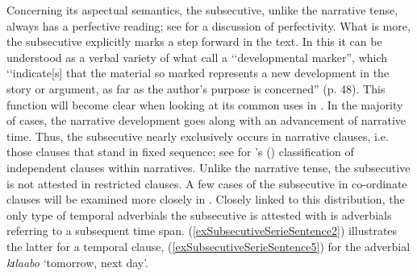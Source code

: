 Concerning its aspectual semantics, the subsecutive, unlike the narrative tense, always has a perfective reading; see  for a discussion of perfectivity. What is more, the subsecutive explicitly marks a step forward in the text. In this it can be understood as a verbal variety of what \citet{DooleyRALevinsohnSH2000} call a \lq\lq developmental marker'', which \lq\lq indicate[s] that the material so marked represents a new development in the story or argument, as far as the author's purpose is concerned'' (p. 48). This function will become clear when looking at its common uses in . In the majority of cases, the narrative development goes along with an advancement of narrative time. Thus, the subsecutive nearly exclusively occurs in narrative clauses, i.e. those clauses that stand in fixed sequence; see  for \citeauthor{LabovWWaletzkyJ1967}'s (\citeyear{LabovWWaletzkyJ1967}) classification of independent clauses within narratives. Unlike the narrative tense, the subsecutive is not attested in restricted clauses. A few cases of the subsecutive in co-ordinate clauses will be examined more closely in . Closely linked to this distribution, the only type of temporal adverbials the subsecutive is attested with is adverbials referring to a subsequent time span. (\ref{exSubsecutiveSerieSentence2}) illustrates the latter for a temporal clause, (\ref{exSubsecutiveSerieSentence5}) for the adverbial \textit{kɪlaabo} \lq tomorrow, next day'. 

